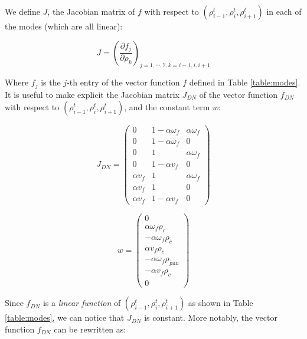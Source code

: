 \hspace{10mm}

We define $J$, the Jacobian matrix of $f$ with respect to $(\rho^{t}_{i-1},\rho^{t}_{i},\rho^{t}_{i+1})$ in each of the modes (which are all linear):

\begin{equation}\label{eq:jacobian}
J = \left(\frac{\partial f_{j}}{\partial \rho_{k}}\right)_{j=1,\cdots,7,k=i-1,i,i+1}
\end{equation}

\noindent Where $f_{j}$ is the $j$-th entry of the vector function $f$ defined in Table \ref{table:modes}. It is useful to make explicit the Jacobian matrix $J_{DN}$ of the vector function $f_{DN}$ with respect to $(\rho^{t}_{i-1},\rho^{t}_{i},\rho^{t}_{i+1})$, and the constant term $w$:

\begin{equation} \label{eq:jacobianDN}
J_{DN} = \left( \begin{array}{ccc}
0 & 1 - \alpha \omega_{f} & \alpha \omega_{f} \\
0 & 1 - \alpha \omega_{f} & 0 \\
0 & 1 & \alpha \omega_{f} \\
0 &  1 - \alpha v_{f} & 0 \\
\alpha v_{f} & 1 & \alpha \omega_{f} \\
\alpha v_{f} & 1 & 0 \\
\alpha v_{f} & 1 - \alpha v_{f} & 0
\end{array} \right)
\end{equation}

\begin{equation}\label{eq:jacobianDN2}
w = \left( \begin{array}{c}
0 \\
\alpha \omega_{f} \rho_{c}\\
-\alpha \omega_{f} \rho_{c}\\
\alpha v_{f} \rho_{c}\\
-\alpha \omega_{f} \rho_{\text{jam}}\\
-\alpha v_{f} \rho_{c}\\
0
\end{array} \right)
\end{equation}

Since $f_{DN}$ is a \textit{linear function} of $(\rho^{t}_{i-1},\rho^{t}_{i},\rho^{t}_{i+1})$ as shown in Table \ref{table:modes}, we can notice that $J_{DN}$ is constant. More notably, the vector function $f_{DN}$ can be rewritten as:

